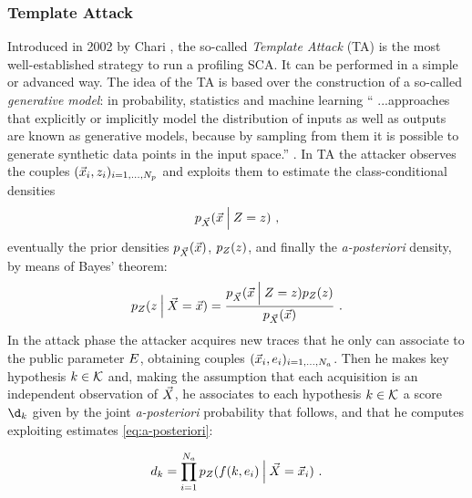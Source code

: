 \subsubsection{Template Attack}\label{sec:TA}
Introduced in 2002 by Chari \cite{Chari2003}, the so-called \emph{Template Attack} (TA) is the most well-established strategy to run a profiling SCA. It can be performed in a simple or advanced way. The idea of the TA is based over the construction of a so-called \emph{generative model}: in probability, statistics and machine learning \enquote{ ...approaches that explicitly or implicitly model the distribution of inputs as well as outputs are known as generative models, because by sampling from them it is possible to generate synthetic data points in the input space.} \cite{christopher2006pattern}.
In TA the attacker observes the couples $(\vec{x}_i, z_i)_{i=1, \dots , N_p}$  and exploits them to estimate the class-conditional densities  
\begin{equation}\label{eq:class-conditional}
p_{\vec{X}}(\vec{x} \:\Big\vert\: Z = z)\mbox{ ,}
\end{equation}
eventually the prior densities $p_{\vec{X}}(\vec{x})$, $p_{Z}(z)$, and finally the \textit{a-posteriori} density, by means of Bayes' theorem:
\begin{equation}\label{eq:a-posteriori}
p_{Z}(z \:\Big\vert\: \vec{X} = \vec{x}) = \frac{p_{\vec{X}}(\vec{x} \:\Big\vert\: Z = z)p_{Z}(z)} {p_{\vec{X}}(\vec{x})}\mbox{ .}
\end{equation}
In the attack phase the attacker acquires new traces that he only can associate to the public parameter $E$, obtaining couples  $(\vec{x}_i, e_i)_{i=1, \dots , N_a}$. Then he makes key hypothesis $k \in \mathcal{K}$ and, making the assumption that each acquisition is an independent observation of $\vec{X}$, he associates to each hypothesis $k \in \mathcal{K}$ a score $\d_\keyVar$ given by the joint \textit{a-posteriori} probability that follows, and that he computes exploiting estimates \eqref{eq:a-posteriori}:

\begin{equation}\label{eq:joint_distr}
d_{k} = \prod_{i=1}^{N_a} p_{Z}(f(k,e_i) \:\Big\vert\: \vec{X} = \vec{x}_i) \mbox{ .}
\end{equation}

